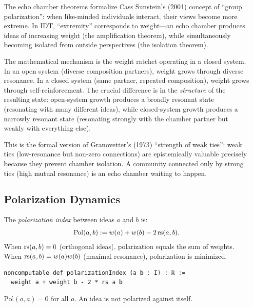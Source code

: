 \begin{interpretation}
\label{interp:echo-chambers}
The echo chamber theorems formalize Cass Sunstein's (2001) concept of
``group polarization'': when like-minded individuals interact, their views
become more extreme.  In IDT, ``extremity'' corresponds to weight---an echo
chamber produces ideas of increasing weight (the amplification theorem),
while simultaneously becoming isolated from outside perspectives (the
isolation theorem).

The mathematical mechanism is the weight ratchet operating in a closed
system.  In an open system (diverse composition partners), weight grows
through diverse resonance.  In a closed system (same partner, repeated
composition), weight grows through self-reinforcement.  The crucial difference
is in the \emph{structure} of the resulting state: open-system growth produces
a broadly resonant state (resonating with many different ideas), while
closed-system growth produces a narrowly resonant state (resonating strongly
with the chamber partner but weakly with everything else).

This is the formal version of Granovetter's (1973) ``strength of weak ties'':
weak ties (low-resonance but non-zero connections) are epistemically valuable
precisely because they prevent chamber isolation.  A community connected only
by strong ties (high mutual resonance) is an echo chamber waiting to happen.
\end{interpretation}


\subsection{Polarization Dynamics}

\begin{definition}
\label{def:polarization-index}
The \emph{polarization index} between ideas $a$ and $b$ is:
\[
  \text{Pol}(a, b) := w(a) + w(b) - 2\,\mathrm{rs}(a, b).
\]
When $\mathrm{rs}(a, b) = 0$ (orthogonal ideas), polarization equals the sum of
weights.  When $\mathrm{rs}(a, b) = w(a) w(b)$ (maximal resonance), polarization is
minimized.

\begin{lstlisting}[caption={Lean 4: Polarization index}]
noncomputable def polarizationIndex (a b : I) : ℝ :=
  weight a + weight b - 2 * rs a b
\end{lstlisting}
\end{definition}

\begin{theorem}
\label{thm:self-polarization}
$\text{Pol}(a, a) = 0$ for all $a$.  An idea is not polarized against itself.
\end{theorem}

